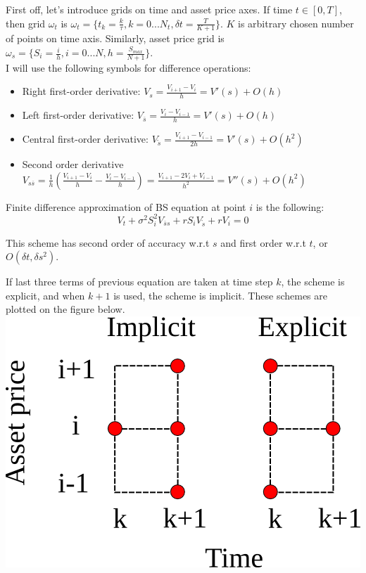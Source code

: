\documentclass[11pt]{article} %
\begin{document}
First off, let's introduce grids on time and asset price axes. If time $t \in [0,T]$, then grid $\omega_t$ is $\omega_t = \lbrace t_k =\frac{k}{\tau}, k = 0...N_t, \delta t = \frac{T}{K+1}\rbrace$. $K$ is arbitrary chosen number of points on time axis. Similarly, asset price grid is $\omega_s = \lbrace S_i = \frac{i}{h}, i = 0...N, h = \frac{S_{max}}{N+1}\rbrace$.\\

I will use the following symbols for difference operations:
\begin{itemize}
	\item Right first-order derivative: $V_s =\frac{V_{i+1}-V_i}{h} = V'(s) + O(h)$
	\item Left first-order derivative: $V_{\overline{s}} =\frac{V_{i}-V_{i-1}}{h} = V'(s) + O(h)$
	\item Central first-order derivative: $V_{\mathring{s}} =\frac{V_{i+1}-V_{i-1}}{2h} = V'(s) + O(h^2)$
	\item Second order derivative $V_{s\overline{s}} = \frac{1}{h}\left(\frac{V_{i+1}-V_i}{h} - \frac{V_{i}-V_{i-1}}{h}\right) = \frac{V_{i+1}-2V_{i}+V_{i-1}}{h^2} = V''(s) + O(h^2)$
\end{itemize}

Finite difference approximation of BS equation at point $i$ is the following:
\begin{equation}
V_t + \sigma^2 S_i^2 V_{\overline{s}s} + r S_i V_{\mathring{s}} + rV_i = 0
\end{equation}

This scheme has second order of accuracy w.r.t $s$ and first order w.r.t $t$, or $O(\delta t, \delta s^2)$.

If last three terms of previous equation are taken at time step $k$, the scheme is explicit, and when $k+1$ is used, the scheme is implicit. These schemes are plotted on the figure below.\\
\includegraphics[scale=0.5]{schemes.png}\\ 
\end{document}

